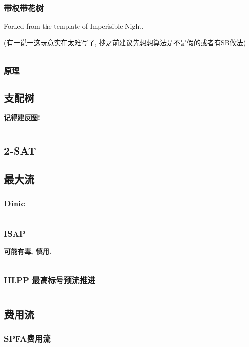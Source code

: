 \documentclass[a4paper, twoside]{article}
\begin{document}
\begin{multicols}{2}
				\subsubsection{带权带花树}
					Forked from the template of Imperisible Night.

					(有一说一这玩意实在太难写了, 抄之前建议先想想算法是不是假的或者有SB做法)
					\inputminted{cpp}{../src/graph/带权带花树.cpp}
				
				\subsubsection{原理}
					

			
			\subsection{支配树}
				\textbf{记得建反图!}
				\inputminted{cpp}{../src/graph/支配树.cpp}

			\subsection{2-SAT}
				

			\subsection{最大流}
				\subsubsection{Dinic}
					\inputminted{cpp}{../src/graph/Dinic.cpp}

				\subsubsection{ISAP}
					\textbf{可能有毒, 慎用.}
					\inputminted{cpp}{../src/graph/ISAP.cpp}

				\subsubsection{HLPP 最高标号预流推进}
					\inputminted{cpp}{../src/graph/HLPP.cpp}
			
			\subsection{费用流}
				\subsubsection{SPFA费用流}
					\inputminted{cpp}{../src/graph/SPFA费用流.cpp}


\end{multicols}
\end{document}
